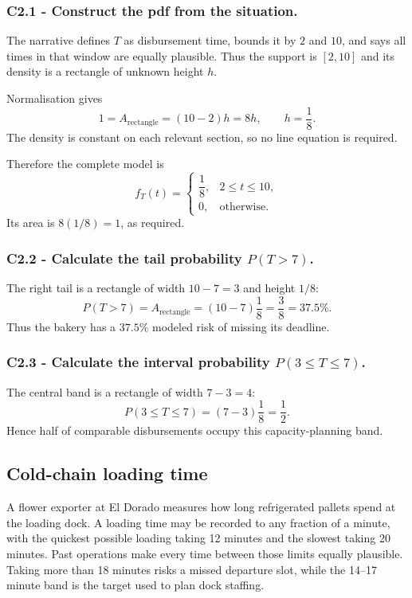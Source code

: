 \subsubsection*{C2.1 - Construct the pdf from the situation.}
\label{subsec:c2-uniform-service-a}
The narrative defines $T$ as disbursement time, bounds it by $2$ and $10$, and
says all times in that window are equally plausible.  Thus the support is
$[2,10]$ and its density is a rectangle of unknown height $h$.

Normalisation
gives
\[
 1=A_{\mathrm{rectangle}}=(10-2)h=8h,\qquad h=\frac18.
\]
The density is constant on each relevant section, so no line equation is required.

Therefore the complete model is
\[
 f_T(t)=\begin{cases}\dfrac18,&2\le t\le10,\\[2mm]0,&\text{otherwise.}\end{cases}
\]
Its area is $8(1/8)=1$, as required.

\subsubsection*{C2.2 - Calculate the tail probability $P(T>7)$.}
\label{subsec:c2-uniform-service-b}
The right tail is a rectangle of width $10-7=3$ and height $1/8$:
\[
 P(T>7)=A_{\mathrm{rectangle}}=(10-7)\frac18=\frac38=37.5\%.
\]
Thus the bakery has a $37.5\%$ modeled risk of missing its deadline.

\subsubsection*{C2.3 - Calculate the interval probability $P(3\le T\le7)$.}
\label{subsec:c2-uniform-service-c}
The central band is a rectangle of width $7-3=4$:
\[
 P(3\le T\le7)=(7-3)\frac18=\frac12.
\]
Hence half of comparable disbursements occupy this capacity-planning band.

\subsection{Cold-chain loading time}\label{sec:c2-uniform-cold-chain}
A flower exporter at El Dorado measures how long refrigerated pallets spend at
the loading dock.  A loading time may be recorded to any fraction of a minute,
with the quickest possible loading taking 12 minutes and the slowest taking 20
minutes.  Past operations make every time between those limits equally
plausible.  Taking more than 18 minutes risks a missed departure slot, while
the 14--17 minute band is the target used to plan dock staffing.

